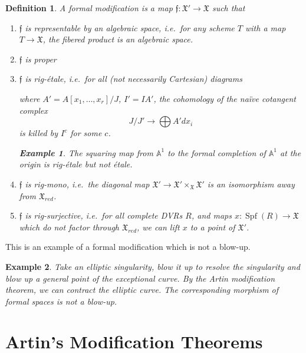 \documentclass{amsart}
\newtheorem*{defn}{Definition}
\newtheorem*{ex}{Example}
\newcommand{\X}{\mathfrak{X}\xspace}
\newcommand{\f}{\mathfrak{f}\xspace}
\DeclareMathOperator{\Spf}{Spf}
\begin{document}
\begin{defn}
A formal modification is a map $\f:\X' \to \X$ such that
\begin{enumerate}
\item $\f$ is representable by an algebraic space, i.e.~for any scheme $T$ with a map $T \to \X$, the fibered product is an algebraic space.

\item $\f$ is proper

\item $\f$ is rig-\'etale, i.e.~for all (not necessarily Cartesian) diagrams 

where $A'=A[x_1,\ldots,x_r]/J$, $I'=IA'$, the cohomology of the na\"ive cotangent complex \[ J/J' \to \bigoplus A' d x_i\] is killed by $I^c$ for some $c$.

\begin{ex}
The squaring map from $\mathbb{A}^1$ to the formal completion of $\mathbb{A}^1$ at the origin is rig-\'etale but not \'etale.
\end{ex}

\item $\f$ is rig-mono, i.e.~the diagonal map $\X' \to \X' \times_\X \X'$ is an isomorphism away from $\X_{red}$.

\item $\f$ is rig-surjective, i.e.~for all complete DVRs $R$, and maps $x:\Spf(R) \to \X$ which do not factor through $\X_{red}$, we can lift $x$ to a point of $\X'$.

\end{enumerate}
\end{defn}

This is an example of a formal modification which is not a blow-up.

\begin{ex}
Take an elliptic singularity, blow it up to resolve the singularity and blow up a general point of the exceptional curve. By the Artin modification theorem, we can contract the elliptic curve. The corresponding morphism of formal spaces is not a blow-up.
\end{ex}

\section{Artin's Modification Theorems}
\end{document}
